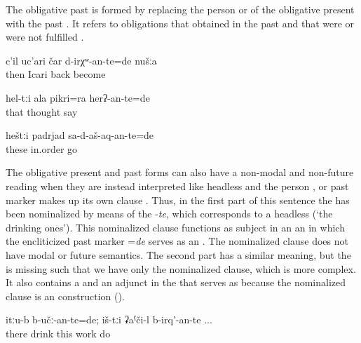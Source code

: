 The obligative past is formed by replacing the person  or  of the obligative present with the past . It refers to obligations that obtained in the past and that were or were not fulfilled .
%
\begin{exe}
	\ex	\label{ex:Then we had to be back in Icari analytic}
	\gll	c'il	uc'ari	čar	d-irχʷ-an-te=de	nušːa\\
		then	Icari	back	become	\\
	\glt	{}

	\ex	\label{ex:(You) should have told your thoughts analytic}
	\gll	hel-tːi	ala	pikri=ra	herʔ-an-te=de\\
		that		thought		say\\
	\glt	{}

	\ex	\label{ex:‎‎These (pictures) should have been come in the right order}
	\gll	heštːi	padrjad	sa-d-aš-aq-an-te=de\\
		these	in.order	go\\
	\glt	{}
\end{exe}

The obligative present and past forms can also have a non-modal and non-future reading when they are instead interpreted like headless  and the person ,  or past marker makes up its own  clause . Thus, in the first part of this sentence the  has been nominalized by means of the  -\textit{te}, which corresponds to a headless  (`the drinking ones'). This nominalized clause functions as subject in an an  in which the encliticized past marker =\textit{de} serves as an . The nominalized clause does not have modal or future semantics. The second part has a similar meaning, but the  is missing such that we have only the nominalized clause, which is more complex. It also contains a  and an adjunct in the  that serves as  because the nominalized clause is an  construction ().
%
\begin{exe}
	\ex	\label{ex:There were the drinking ones; these (are) the working ones}
	\gll	itːu-b	b-učː-an-te=de;	iš-tːi	ʡaˁči-l	b-irq'-an-te ...\\
		there	drink	this	work	do\\
	\glt	{}
\end{exe}


